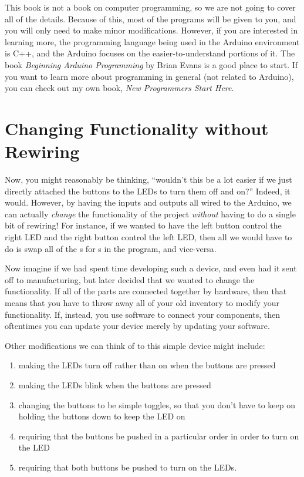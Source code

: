 This book is not a book on computer programming, so we are not going to cover all of the details.
Because of this, most of the programs will be given to you, and you will only need to make minor modifications.
However, if you are interested in learning more, the programming language being used in the Arduino environment is C++, and the Arduino focuses on the easier-to-understand portions of it.
The book \emph{Beginning Arduino Programming} by Brian Evans is a good place to start.
If you want to learn more about programming in general (not related to Arduino), you can check out my own book, \emph{New Programmers Start Here}.

\section{Changing Functionality without Rewiring}

Now, you might reasonably be thinking, ``wouldn't this be a lot easier if we just directly attached the buttons to the LEDs to turn them off and on?''
Indeed, it would. 
However, by having the inputs and outputs all wired to the Arduino, we can actually \emph{change} the functionality of the project \emph{without} having to do a single bit of rewiring!
For instance, if we wanted to have the left button control the right LED and the right button control the left LED, then all we would have to do is swap all of the s for s in the program, and vice-versa.

Now imagine if we had spent time developing such a device, and even had it sent off to manufacturing, but later decided that we wanted to change the functionality.
If all of the parts are connected together by hardware, then that means that you have to throw away all of your old inventory to modify your functionality.
If, instead, you use software to connect your components, then oftentimes you can update your device merely by updating your software.

Other modifications we can think of to this simple device might include:
\begin{enumerate}
\item making the LEDs turn off rather than on when the buttons are pressed
\item making the LEDs blink when the buttons are pressed
\item changing the buttons to be simple toggles, so that you don't have to keep on holding the buttons down to keep the LED on
\item requiring that the buttons be pushed in a particular order in order to turn on the LED
\item requiring that both buttons be pushed to turn on the LEDs.
\end{enumerate}

